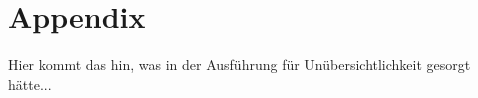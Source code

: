 \chapter{Appendix}
\label{A_Appendix}
% 
Hier kommt das hin, was in der Ausführung für Unübersichtlichkeit gesorgt
hätte...
